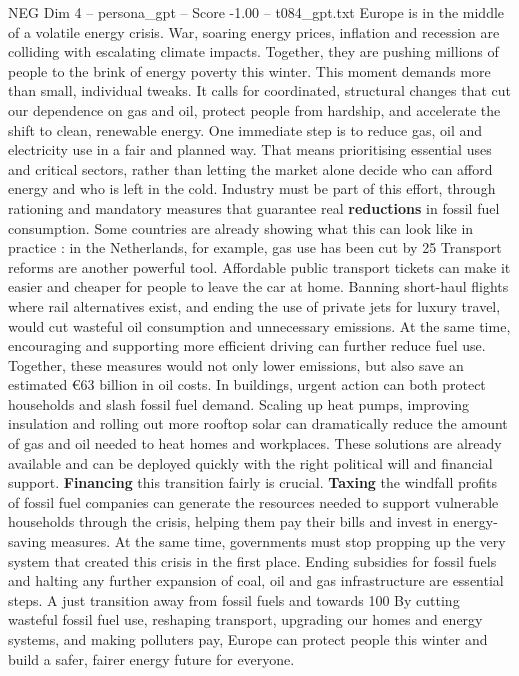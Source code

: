 \begin{textsample}{NEG Dim 4 – persona\_gpt – Score -1.00 – t084\_gpt.txt}  \label{ex:f4_neg_031}
Europe is in the middle of a volatile energy crisis.
War, soaring energy prices, inflation and recession are colliding with escalating climate impacts.
Together, they are pushing millions of people to the brink of energy poverty this winter.
This moment demands more than small, individual tweaks.
It calls for coordinated, structural changes that cut our dependence on gas and oil, protect people from hardship, and accelerate the shift to clean, renewable energy.
One immediate step is to reduce gas, oil and electricity use in a fair and planned way.
That means prioritising essential uses and critical sectors, rather than letting the market alone decide who can afford energy and who is left in the cold.
Industry must be part of this effort, through rationing and mandatory measures that guarantee real \textbf{reductions} in fossil fuel consumption.
Some countries are already showing what this can look like in practice : in the Netherlands, for example, gas use has been cut by 25 %
Transport reforms are another powerful tool.
Affordable public transport tickets can make it easier and cheaper for people to leave the car at home.
Banning short-haul flights where rail alternatives exist, and ending the use of private jets for luxury travel, would cut wasteful oil consumption and unnecessary emissions.
At the same time, encouraging and supporting more efficient driving can further reduce fuel use.
Together, these measures would not only lower emissions, but also save an estimated €63 billion in oil costs.
In buildings, urgent action can both protect households and slash fossil fuel demand.
Scaling up heat pumps, improving insulation and rolling out more rooftop solar can dramatically reduce the amount of gas and oil needed to heat homes and workplaces.
These solutions are already available and can be deployed quickly with the right political will and financial support. \textbf{Financing} this transition fairly is crucial. \textbf{Taxing} the windfall profits of fossil fuel companies can generate the resources needed to support vulnerable households through the crisis, helping them pay their bills and invest in energy-saving measures.
At the same time, governments must stop propping up the very system that created this crisis in the first place.
Ending subsidies for fossil fuels and halting any further expansion of coal, oil and gas infrastructure are essential steps.
A just transition away from fossil fuels and towards 100 %
By cutting wasteful fossil fuel use, reshaping transport, upgrading our homes and energy systems, and making polluters pay, Europe can protect people this winter and build a safer, fairer energy future for everyone.

\end{textsample}

